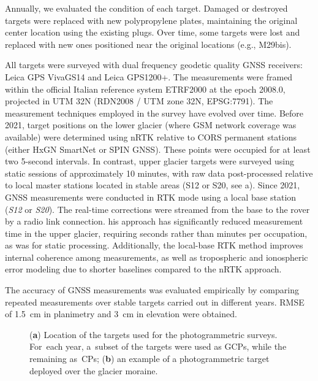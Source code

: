 Annually, we evaluated the condition of each target. Damaged or destroyed targets were replaced with new polypropylene plates, maintaining the original center location using the existing plugs. 
Over time, some targets were lost and replaced with new ones positioned near the original locations (e.g., M29bis).

All targets were surveyed with dual frequency geodetic quality GNSS receivers: 
Leica GPS VivaGS14 and Leica GPS1200+.
The measurements were framed within the official Italian reference system ETRF2000
at the epoch 2008.0, projected in UTM 32N (RDN2008 / UTM zone 32N, EPSG:7791).
The measurement techniques employed in the survey have evolved over time.
Before 2021, target positions on the lower glacier (where GSM network coverage was available) 
were determined using nRTK relative to CORS permanent stations (either HxGN SmartNet or SPIN GNSS).
These points were occupied for at least two 5-second intervals. 
In contrast, upper glacier targets were surveyed using static sessions of approximately 10 
minutes, with raw data post-processed relative to local master stations located in stable areas 
(S12 or S20, see a).
Since 2021, GNSS measurements were conducted in RTK mode using a local base station 
(\textit{S12} or \textit{S20}).
The real-time corrections were streamed from the base to the rover by a radio link connection. 
his approach has significantly reduced measurement time in the upper glacier, requiring seconds 
rather than minutes per occupation, as was for static processing.
Additionally, the local-base RTK method improves internal coherence among measurements, 
as well as tropospheric and ionospheric error modeling due to shorter baselines compared to 
the nRTK approach.

The accuracy of GNSS measurements was evaluated empirically by comparing repeated
measurements over stable targets carried out in different years.
RMSE of \qty{1.5}{\centi\meter} in planimetry and \qty{3}{\centi\meter} in elevation were
obtained.

\begin{figure}
    \centering
    \caption{(\textbf{a}) Location of the targets used for the
        photogrammetric surveys. For~each year, a~subset of the targets were used as GCPs, while the remaining as~CPs; (\textbf{b}) an example of a photogrammetric target deployed over the glacier moraine.}
    \label{fig:3:belvedereGCP}
\end{figure}

